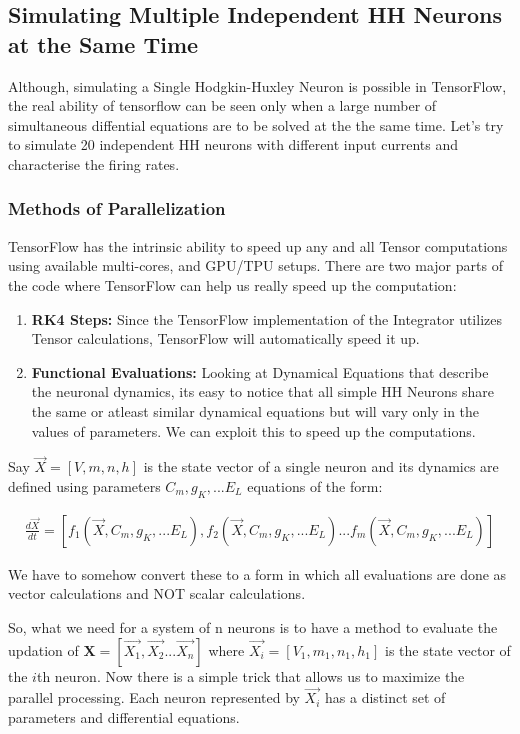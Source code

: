 \documentclass[10pt,letterpaper]{article}
\begin{document}
\subsection*{Simulating Multiple Independent HH Neurons at the Same Time}

Although, simulating a Single Hodgkin-Huxley Neuron is possible in TensorFlow, the real ability of tensorflow can be seen only when a large number of simultaneous diffential equations are to be solved at the the same time. Let's try to simulate 20 independent HH neurons with different input currents and characterise the firing rates. 

\subsubsection*{Methods of Parallelization}
TensorFlow has the intrinsic ability to speed up any and all Tensor computations using available multi-cores, and GPU/TPU setups. There are two major parts of the code where TensorFlow can help us really speed up the computation:
\begin{enumerate}
\item \textbf{RK4 Steps:} Since the TensorFlow implementation of the Integrator utilizes Tensor calculations, TensorFlow will automatically speed it up.
\item \textbf{Functional Evaluations:} Looking at Dynamical Equations that describe the neuronal dynamics, its easy to notice that all simple HH Neurons share the same or atleast similar dynamical equations but will vary only in the values of parameters. We can exploit this to speed up the computations.
\end{enumerate}

Say $\vec{X}=[V,m,n,h]$ is the state vector of a single neuron and its dynamics are defined using parameters $C_m,g_K,...E_L$ equations of the form: 

\begin{eqnarray}\frac{d\vec{X}}{dt} = [f_1(\vec{X},C_m,g_K,...E_L),f_2(\vec{X},C_m,g_K,...E_L)...f_m(\vec{X},C_m,g_K,...E_L)]\end{eqnarray}

We have to somehow convert these to a form in which all evaluations are done as vector calculations and NOT scalar calculations.

So, what we need for a system of n neurons is to have a method to evaluate the updation of $\mathbf{X}=[\vec{X_1},\vec{X_2}...\vec{X_n}]$ where $\vec{X_i}=[V_1,m_1,n_1,h_1]$ is the state vector of the $i$th neuron. Now there is a simple trick that allows us to maximize the parallel processing. Each neuron represented by $\vec{X_i}$ has a distinct set of parameters and differential equations.
\end{document}
